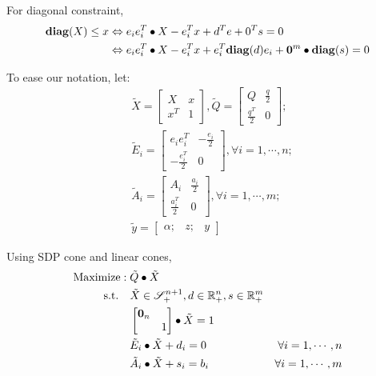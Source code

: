 \documentclass[../main]{subfiles}
\begin{document}
For diagonal constraint,
\begin{align*}
    \mathbf{diag}(X) \le x & \Leftrightarrow e_ie_i^T \bullet X - e_i^T x + d^Te + 0^Ts = 0                                 \\
                   & \Leftrightarrow e_ie_i^T \bullet X - e_i^T x + e_i^T\mathbf{diag}(d)e_i + \bm 0^m \bullet \mathbf{diag}(s) = 0
\end{align*}

To ease our notation, let:
\begin{align*}
     & \tilde X = \begin{bmatrix} X             & x \\ x^T & 1 \end{bmatrix}, \tilde Q = \begin{bmatrix} Q & \frac{q}{2} \\ \frac{q^T}{2} & 0 \end{bmatrix} ; \\
     & \tilde E_i = \begin{bmatrix} e_ie_i^T  & -\frac{e_i}{2} \\ -\frac{e_i^T}{2} & 0 \end{bmatrix}, \forall i=1,\cdots,n;                \\
     & \tilde A_i = \begin{bmatrix} A_i             & \frac{a_i}{2} \\ \frac{a_i^T}{2} & 0 \end{bmatrix}, \forall i=1,\cdots,m;               \\
     & \tilde y = \begin{bmatrix} \alpha; & z; & y \end{bmatrix}
\end{align*}

Using SDP cone and linear cones,
\begin{equation} \label{eq:ws.std.primal}
    \begin{aligned}
        \mathrm{Maximize:\;}            & \tilde Q \bullet \tilde X                                                         \\
        \mathrm{s.t.} \quad & \tilde X  \in \mathscr S^{n+1}_+, d \in \mathbb{R}^n_+, s
        \in \mathbb{R}^m_+                                                                                      \\
                            & \begin{bmatrix}  \bm 0_n &  \\  & 1  \end{bmatrix} \bullet \tilde X = 1                                   \\
                            & \tilde E_i \bullet \tilde X + d_i = 0                     & \forall i=1,\cdots, n \\
                            & \tilde A_i \bullet \tilde X + s_i = b_i                   & \forall i=1,\cdots, m \\
    \end{aligned}
\end{equation}
\end{document}

